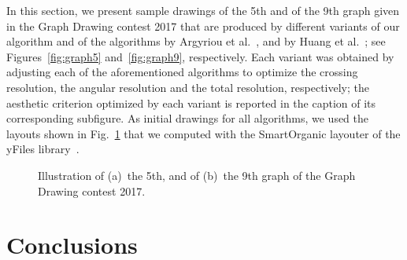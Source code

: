 \documentclass{comjnl}
\begin{document}
In this section, we present sample drawings of the 5th and of the 9th graph given in the Graph Drawing contest 2017 that are produced by different variants of our algorithm and of the algorithms by Argyriou et al.~\cite{DBLP:journals/cj/ArgyriouBS13}, and by Huang et al.~\cite{DBLP:journals/vlc/HuangEHL13}; see Figures~\ref{fig:graph5} and~\ref{fig:graph9}, respectively. Each variant was obtained by adjusting each of the aforementioned algorithms to optimize the crossing resolution, the angular resolution and the total resolution, respectively; the aesthetic criterion optimized by each variant is reported in the caption of its corresponding subfigure. As initial drawings for all algorithms, we used the layouts shown in Fig.~\ref{fig:graph5And9-yfiles} that we computed with the SmartOrganic layouter of the yFiles library~\cite{DBLP:books/sp/04/WieseE004}.

\begin{figure}[t]
\centering
{}

\caption{Illustration of 
(a)~the 5th, and of
(b)~the 9th graph of the Graph Drawing contest 2017.}
\label{fig:graph5And9-yfiles}
\end{figure}

\section{Conclusions}
\label{sec:conclusions}
\end{document}
